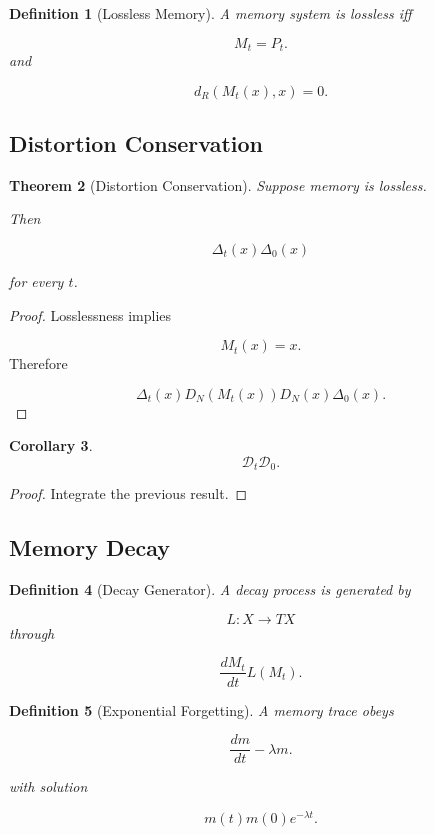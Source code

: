 \documentclass[12pt]{article}
\newtheorem{theorem}{Theorem}[section]
\newtheorem{corollary}[theorem]{Corollary}
\newtheorem{definition}[theorem]{Definition}
\theoremstyle{remark}
\begin{document}
\begin{definition}[Lossless Memory]
A memory system is lossless iff

\[
M_t=P_t.
\]
\]
and

\[
d_R(M_t(x),x)=0.
\]
\end{definition}
\subsection{Distortion Conservation}

\begin{theorem}[Distortion Conservation]
Suppose memory is lossless.

Then

\[
\Delta_t(x)
\Delta_0(x)
\]

for every \(t\).
\end{theorem}

\begin{proof}
Losslessness implies

\[
M_t(x)=x.
\]
Therefore

\[
\Delta_t(x)
D_N(M_t(x))

D_N(x)

\Delta_0(x).
\]
\end{proof}

\begin{corollary}
\[
\mathcal D_t
\mathcal D_0.
\]
\end{corollary}

\begin{proof}
Integrate the previous result.
\end{proof}

\subsection{Memory Decay}

\begin{definition}[Decay Generator]
A decay process is generated by

\[
L:X\rightarrow TX
\]
through

\[
\frac{dM_t}{dt}
L(M_t).
\]
\end{definition}

\begin{definition}[Exponential Forgetting]
A memory trace obeys

\[
\frac{dm}{dt}
-\lambda m.
\]
\]

with solution

\[
m(t)
m(0)e^{-\lambda t}.
\]
\end{definition}
\end{document}
